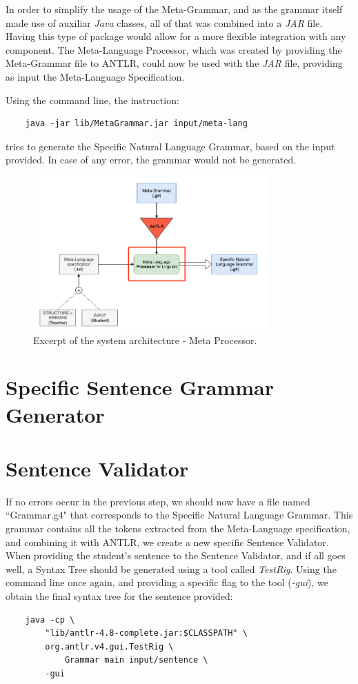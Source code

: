 In order to simplify the usage of the Meta-Grammar, and as the grammar itself made use of auxiliar \emph{Java} classes, all of that was combined into a \emph{JAR} file.
Having this type of package would allow for a more flexible integration with any component.
The Meta-Language Processor, which was created by providing the Meta-Grammar file to ANTLR, could now be used with the \emph{JAR} file, 
providing as input the Meta-Language Specification. 

\noindent Using the command line, the instruction:
\begin{Verbatim}
	java -jar lib/MetaGrammar.jar input/meta-lang
\end{Verbatim}
\noindent tries to generate the Specific Natural Language Grammar, based on the input provided. In case of any error, the grammar would not be generated.

\begin{figure}[h]
    \centering
    \includegraphics[width=9cm]{images/system_meta_processor.png}
    \caption{Excerpt of the system architecture - Meta Processor.}
    \label{fig:system_architecture}
\end{figure}

\section{Specific Sentence Grammar Generator}



\newpage
\section{Sentence Validator}

If no errors occur in the previous step, we should now have a file named ``Grammar.g4" that corresponds to the Specific Natural Language Grammar.
This grammar contains all the tokens extracted from the Meta-Language specification, and combining it with ANTLR, we create a new specific Sentence Validator.
When providing the student's sentence to the Sentence Validator, and if all goes well, a Syntax Tree should be generated using a tool called \emph{TestRig}.
Using the command line once again, and providing a specific flag to the tool (\emph{-gui}), we obtain the final syntax tree for the sentence provided: 
\begin{Verbatim}
	java -cp \ 
		"lib/antlr-4.8-complete.jar:$CLASSPATH" \ 
		org.antlr.v4.gui.TestRig \ 
			Grammar main input/sentence \ 
		-gui
\end{Verbatim}

